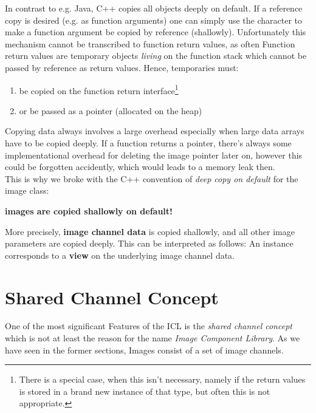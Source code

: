 In contrast to e.g. Java, C++ copies all objects deeply on default. If a reference copy is desired (e.g. as function arguments) one can simply use the \inlinecode{&} character to make a function argument be copied by reference (shallowly). Unfortunately this mechanism cannot be transcribed to function return values, as often Function return values are temporary objects \emph{living} on the function stack which cannot be passed by reference as return values. Hence, temporaries must:
\begin{enumerate}
\item be copied on the function return interface\footnote{There is a special case, when this isn't necessary, namely if the return values is stored in a brand new instance of that type, but often this is not appropriate.}
\item or be passed as a pointer (allocated on the heap)
\end{enumerate}
Copying data always involves a large overhead especially when large data arrays have to be copied deeply. If a function returns a pointer, there's always some implementational overhead for deleting the image pointer later on, however this could be forgotten accidently, which would leads to a memory leak then.\\
This is why we broke with the C++ convention of \emph{deep copy on default} for the image class:
\begin{center}
\textbf{images are copied shallowly on default!}\\[20pt]
\end{center}
More precisely, \textbf{image channel data} is copied shallowly, and all other image parameters are copied deeply. This can be interpreted as follows:
An  instance corresponds to a \textbf{view} on the underlying image channel data.


\section {Shared Channel Concept}

One of the most significant Features of the ICL is the \emph{shared channel concept} which is not at least the reason for the name \emph{Image Component Library}. As we have seen in the former sections, Images consist of a set of image channels. 





